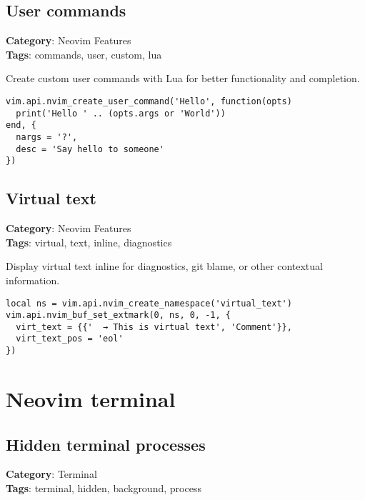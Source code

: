 {{{{{{{{{{\section{User commands}

\textbf{Category}: Neovim Features\\ \textbf{Tags}: commands, user, custom, lua
\vspace{0.5cm}

Create custom user commands with Lua for better functionality and completion.

\begin{Exa*}{}
\begin{Verbatim}[fontsize=\footnotesize, breaklines, breakanywhere]
vim.api.nvim_create_user_command('Hello', function(opts)
  print('Hello ' .. (opts.args or 'World'))
end, {
  nargs = '?',
  desc = 'Say hello to someone'
})
\end{Verbatim}
\end{Exa*}

\section{Virtual text}

\textbf{Category}: Neovim Features\\ \textbf{Tags}: virtual, text, inline, diagnostics
\vspace{0.5cm}

Display virtual text inline for diagnostics, git blame, or other contextual information.

\begin{Exa*}{}
\begin{Verbatim}[fontsize=\footnotesize, breaklines, breakanywhere]
local ns = vim.api.nvim_create_namespace('virtual_text')
vim.api.nvim_buf_set_extmark(0, ns, 0, -1, {
  virt_text = {{'  → This is virtual text', 'Comment'}},
  virt_text_pos = 'eol'
})
\end{Verbatim}
\end{Exa*}

\chapter{Neovim terminal}
\section{Hidden terminal processes}

\textbf{Category}: Terminal\\ \textbf{Tags}: terminal, hidden, background, process
\vspace{0.5cm}

}}}}}}}}}}
